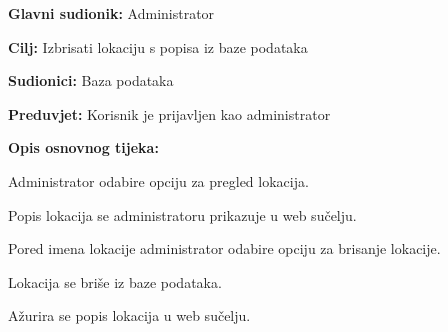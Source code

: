 				\noindent {}
				\begin{packed_item}
					
					\item \textbf{Glavni sudionik: }Administrator
					\item  \textbf{Cilj:} Izbrisati lokaciju s popisa iz baze podataka
					\item  \textbf{Sudionici:} Baza podataka
					\item  \textbf{Preduvjet:} Korisnik je prijavljen kao administrator
					\item  \textbf{Opis osnovnog tijeka:}
					
					\item[] \begin{packed_enum}
						
						\item Administrator odabire opciju za pregled lokacija.
						\item Popis lokacija se administratoru prikazuje u web sučelju.
						\item Pored imena lokacije administrator odabire opciju za brisanje lokacije.
						\item Lokacija se briše iz baze podataka.
						\item Ažurira se popis lokacija u web sučelju.
					\end{packed_enum}
				\end{packed_item}
				
